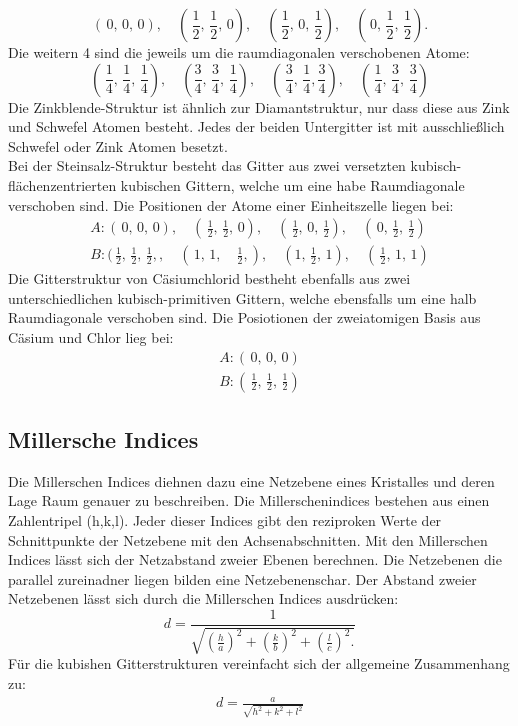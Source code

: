 $$(\,0,\,0,\,0), \quad (\,\frac{1}{2},\, \frac{1}{2} ,\, 0), \quad (\, \frac{1}{2}, \,0 ,\, \frac{1}{2}),
\quad (\,0, \, \frac{1}{2} , \, \frac{1}{2}).$$
Die weitern 4 sind die jeweils um die raumdiagonalen verschobenen Atome:
$$ (\, \frac{1}{4},\, \frac{1}{4}, \, \frac{1}{4}), \quad (\frac{3}{4}, \, \frac{3}{4}, \, \frac{1}{4}),
\quad (\, \frac{3}{4}, \, \frac{1}{4}, \frac{3}{4}), \quad (\,\frac{1}{4},\,  \frac{3}{4}, \, \frac{3}{4}) $$
Die Zinkblende-Struktur ist ähnlich zur Diamantstruktur, nur dass diese aus
Zink und Schwefel Atomen besteht. Jedes der beiden Untergitter
ist mit ausschließlich Schwefel oder Zink Atomen besetzt.\\
Bei der Steinsalz-Struktur besteht das Gitter aus zwei versetzten kubisch-flächenzentrierten
kubischen Gittern, welche um eine habe Raumdiagonale verschoben sind. Die
Positionen der Atome einer Einheitszelle liegen bei:
\begin{align}
    A:(\,0,\,0,\,0), \quad (\,\frac{1}{2},\, \frac{1}{2} ,\, 0), \quad (\, \frac{1}{2}, \,0 ,\, \frac{1}{2}),
    \quad (\,0, \, \frac{1}{2} , \, \frac{1}{2}) \\
    B:(\,\frac{1}{2},\,\frac{1}{2},\,\frac{1}{2},, \quad (\,1 , \, 1 , \quad\frac{1}{2},)
    ,\quad (1, \,\frac{1}{2}, \,1),\quad (\,\frac{1}{2}, \, 1, \,1)
\end{align}
Die Gitterstruktur von Cäsiumchlorid bestheht ebenfalls aus zwei unterschiedlichen
kubisch-primitiven Gittern, welche ebensfalls um eine halb Raumdiagonale
verschoben sind. Die Posiotionen der zweiatomigen Basis aus Cäsium und Chlor lieg bei:
\begin{align}
A:(\,0 , \, 0 , \, 0)\\
B:(\, \frac{1}{2},\, \frac{1}{2},\, \frac{1}{2})
\end{align}
\subsection{Millersche Indices}
Die Millerschen Indices diehnen dazu eine Netzebene eines Kristalles und deren
Lage Raum genauer zu beschreiben. Die Millerschenindices bestehen aus einen Zahlentripel
(h,k,l). Jeder dieser Indices gibt den reziproken Werte der Schnittpunkte der
Netzebene mit den Achsenabschnitten. Mit den Millerschen Indices lässt sich der
Netzabstand zweier Ebenen berechnen. Die Netzebenen die parallel zureinadner
liegen bilden eine Netzebenenschar. Der Abstand zweier Netzebenen lässt sich
durch die Millerschen Indices ausdrücken:
$$ d=\frac{1}{\sqrt{
\left(\frac{h}{a} \right)^2 + \left(\frac{k}{b} \right)^2 + \left(\frac{l}{c} \right)^2.
}}
$$
Für die kubishen Gitterstrukturen vereinfacht sich der allgemeine Zusammenhang zu:
\begin{align}
d=\frac{a}{\sqrt{h^2 + k^2 + l^2}}
\label{gitti}
\end{align}
